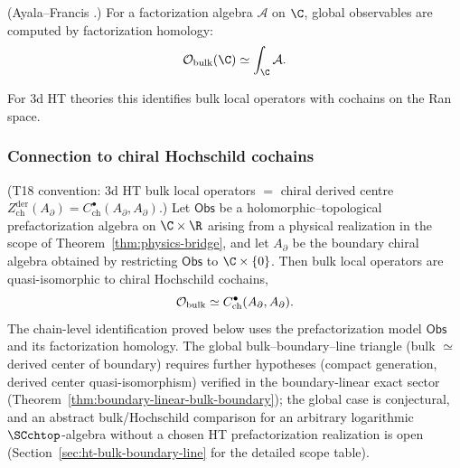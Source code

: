 \begin{theorem}
\label{thm:bulk_factorization}
(Ayala--Francis \cite{AF15}.) For a factorization algebra $\mathcal{A}$ on $\C$, global observables are computed by factorization homology:
\begin{equation}
\mathcal{O}_{\text{bulk}}(\C) \simeq \int_\C \mathcal{A}.
\end{equation}

For 3d HT theories this identifies bulk local operators with cochains on the Ran space.
\end{theorem}

\subsubsection{Connection to chiral Hochschild cochains}

\begin{theorem}[Bulk $=$ chiral Hochschild cochains (physical prefactorization model);
\ClaimStatusConditional]
\label{thm:bulk_hochschild}
(T18 convention: 3d HT bulk local
operators $=$ chiral derived centre
$Z^{\mathrm{der}}_{\mathrm{ch}}(A_{\partial})=C^\bullet_{\mathrm{ch}}(A_{\partial},A_{\partial})$.)
Let $\mathsf{Obs}$ be a holomorphic--topological prefactorization algebra on $\C\times\R$ arising from a physical realization in the scope of Theorem~\ref{thm:physics-bridge}, and let $A_{\partial}$ be the boundary chiral algebra obtained by restricting $\mathsf{Obs}$ to $\C\times\{0\}$. Then bulk local operators are quasi-isomorphic to chiral Hochschild cochains,
\begin{equation}
\mathcal{O}_{\textup{bulk}} \simeq C^\bullet_{\textup{ch}}(A_{\partial}, A_{\partial}).
\end{equation}
The chain-level identification proved below uses the prefactorization model $\mathsf{Obs}$ and its factorization homology.
The global bulk--boundary--line triangle
\textup{(}bulk $\simeq$ derived center of boundary\textup{)} requires further hypotheses
\textup{(}compact generation, derived center quasi-isomorphism\textup{)} verified
in the boundary-linear exact sector
\textup{(}Theorem~\textup{\ref{thm:boundary-linear-bulk-boundary}}\textup{)};
the global case is conjectural, and an abstract bulk/Hochschild comparison for an arbitrary logarithmic $\SCchtop$-algebra without a chosen HT prefactorization realization is open
\textup{(}Section~\textup{\ref{sec:ht-bulk-boundary-line}} for the detailed scope table\textup{)}.
\end{theorem}

